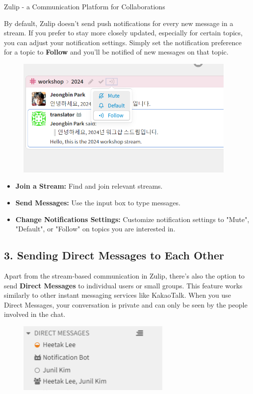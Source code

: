 \begin{coverpage}{Zulip - a Communication Platform for Collaborations}
{By default, Zulip doesn't send push notifications for every new message in a stream. If you prefer to stay more closely updated, especially for certain topics, you can adjust your notification settings. Simply set the notification preference for a topic to \textbf{Follow} and you'll be notified of new messages on that topic.

\begin{figure}[h]
\includegraphics[width=10.8cm]{images/zulip-follow.png}
\centering
\end{figure}

\begin{itemize}[leftmargin=0.5cm, rightmargin=0.5cm]
\item \textbf{Join a Stream:} Find and join relevant streams.
\item \textbf{Send Messages:} Use the input box to type messages.
\item \textbf{Change Notifications Settings:} Customize notification settings to "Mute", "Default", or "Follow" on topics you are interested in.
\end{itemize}
\subsection*{3. Sending Direct Messages to Each Other}
Apart from the stream-based communication in Zulip, there's also the option to send \textbf{Direct Messages} to individual users or small groups. This feature works similarly to other instant messaging services like KakaoTalk. When you use Direct Messages, your conversation is private and can only be seen by the people involved in the chat.

\begin{figure}[h]
\includegraphics[width=7.5cm]{images/zulip-dm.png}
\centering
\end{figure}

}
\end{coverpage}

